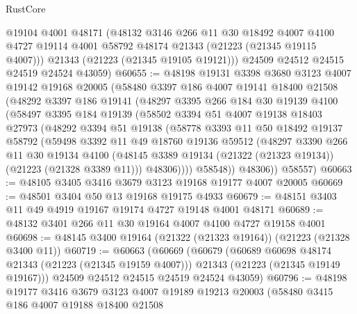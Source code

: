 \begin{lexlean}{RustCore}
\begin{coremodule}
        @19104
        @4001
        @48171
        (@48132
          @3146
          @266
          @11
          @30
          @18492
          @4007
          @4100
          @4727
          @19114
          @4001
          @58792
          @48174
          @21343
          (@21223 (@21345 @19115 @4007)))
        @21343
        (@21223 (@21345 @19105 @19121)))
      @24509
      @24512
      @24515
      @24519
      @24524
      @43059)
@60655 := @48198
    @19131
    @3398
    @3680
    @3123
    @4007
    @19142
    @19168
    @20005
    (@58480
      @3397
      @186
      @4007
      @19141
      @18400
      @21508
      (@48292
        @3397
        @186
        @19141
        (@48297
          @3395
          @266
          @184
          @30
          @19139
          @4100
          (@58497
            @3395
            @184
            @19139
            (@58502
              @3394
              @51
              @4007
              @19138
              @18403
              @27973
              (@48292
                @3394
                @51
                @19138
                (@58778
                  @3393
                  @11
                  @50
                  @18492
                  @19137
                  @58792
                  (@59498
                    @3392
                    @11
                    @49
                    @18760
                    @19136
                    @59512
                    (@48297
                      @3390
                      @266
                      @11
                      @30
                      @19134
                      @4100
                      (@48145 @3389 @19134 (@21322 (@21323 @19134)) (@21223 (@21328 @3389 @11)))
                      @48306))))
              @58548))
          @48306))
      @58557)
@60663 := @48105 @3405 @3416 @3679 @3123 @19168 @19177 @4007 @20005
@60669 := @48501 @3404 @50 @13 @19168 @19175 @4933
@60679 := @48151 @3403 @11 @49 @4919 @19167 @19174 @4727 @19148 @4001 @48171
@60689 := @48132 @3401 @266 @11 @30 @19164 @4007 @4100 @4727 @19158 @4001
@60698 := @48145 @3400 @19164 (@21322 (@21323 @19164)) (@21223 (@21328 @3400 @11))
@60719 := @60663
    (@60669
      (@60679
        (@60689 @60698 @48174 @21343 (@21223 (@21345 @19159 @4007)))
        @21343
        (@21223 (@21345 @19149 @19167)))
      @24509
      @24512
      @24515
      @24519
      @24524
      @43059)
@60796 := @48198
    @19177
    @3416
    @3679
    @3123
    @4007
    @19189
    @19213
    @20003
    (@58480
      @3415
      @186
      @4007
      @19188
      @18400
      @21508

\end{coremodule}
\end{lexlean}
